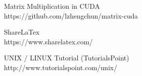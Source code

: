 \pagebreak

\begin{thebibliography}{9}
 
Matrix Multiplication in CUDA
\\https{://github.com/lzhengchun/matrix-cuda}

ShareLaTex
\\https{://www.sharelatex.com/}

UNIX / LINUX Tutorial (TutorialsPoint)
\\http{://www.tutorialspoint.com/unix/}
\end{thebibliography}

